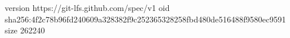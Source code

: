 version https://git-lfs.github.com/spec/v1
oid sha256:4f2c78b96fd240609a328382f9c252365328258fbd480de516488f9580ec9591
size 262240
